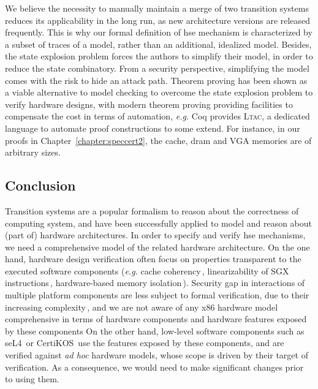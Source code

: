 We believe the necessity to manually maintain a merge of two transition systems
reduces its applicability in the long run, as new architecture versions are
released frequently.
%
This is why our formal definition of \ac{hse} mechanism is characterized by a
subset of traces of a model, rather than an additional, idealized model.
%
Besides, the state explosion problem forces the authors to simplify their model,
in order to reduce the state combinatory.
%
From a security perspective, simplifying the model comes with the risk to hide
an attack path.
%
Theorem proving has been shown as a viable alternative to model checking to
overcome the state explosion problem to verify hardware designs, with modern
theorem proving providing facilities to compensate the cost in terms of
automation, \emph{e.g.} Coq provides {\scshape Ltac}, a dedicated language to
automate proof constructions to some extend.
%
For instance, in our proofs in Chapter~\ref{chapter:speccert2}, the cache,
\ac{dram} and VGA memories are of arbitrary sizes.

\subsection{Conclusion}
%
\label{subsec:sota:ltsconclusion}

Transition systems are a popular formalism to reason about the correctness of
computing system, and have been successfully applied to model and reason about
(part of) hardware architectures.
%
In order to specify and verify \ac{hse} mechanisms, we need a comprehensive
model of the related hardware architecture.
%
On the one hand, hardware design verification often focus on properties
transparent to the executed software components (\emph{e.g.} cache
coherency\,\cite{stern1995cachecoherence}, linearizability of SGX
instructions\,\cite{leslie2015linsgx}, hardware-based memory
isolation\,\cite{lie2003xom}).
%
Security gap in interactions of multiple platform components are less subject to
formal verification, due to their increasing
complexity\,\cite{potlapally2011hardwaresecurity}, and we are not aware of any
x86 hardware model comprehensive in terms of hardware components and hardware
features exposed by these components
%
On the other hand, low-level software components such as
seL4\,\cite{klein2009sel4} or CertiKOS\,\cite{gu2016certikos} use the features
exposed by these components, and are verified against \emph{ad hoc} hardware
models, whose scope is driven by their target of verification.
%
As a consequence, we would need to make significant changes prior to using them.

